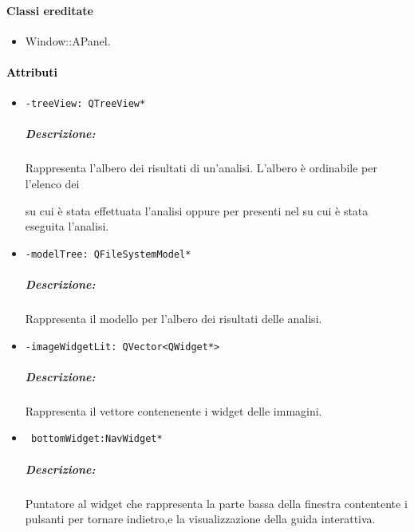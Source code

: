 \paragraph{Classi ereditate\\}
\begin{itemize}
\item Window::APanel.
\end{itemize}
\paragraph{\textcolor{black}{Attributi\\}}
\begin{itemize}
\item\color{teal}\verb!-treeView: QTreeView*!
\color{black}
\subparagraph{Descrizione:}
Rappresenta l'albero dei risultati di un'analisi. L'albero è ordinabile per l'elenco dei \subject{} su cui è stata effettuata l'analisi oppure per \protocol{} presenti nel \dataset{} su cui è stata eseguita l'analisi.

\item\color{teal}\verb!-modelTree: QFileSystemModel* !
\color{black}
\subparagraph{Descrizione:}
 Rappresenta il modello per l'albero dei risultati delle analisi.

\item\color{teal}\verb!-imageWidgetLit: QVector<QWidget*> !
\color{black}
\subparagraph{Descrizione:} Rappresenta il vettore contenenente i widget delle immagini.

\item\color{teal}\verb! bottomWidget:NavWidget*!
\color{black} 
\subparagraph{Descrizione:}
Puntatore al widget che rappresenta la parte bassa della finestra contentente i pulsanti per tornare indietro,e la visualizzazione della guida interattiva.
\end{itemize}

